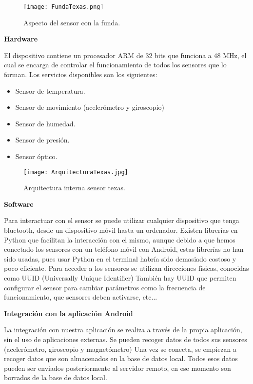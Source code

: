 \documentclass[11pt,spanish]{article}
\begin{document}
\begin{figure}[h!]
  \centering
  \texttt{[image: FundaTexas.png]}
  \caption{Aspecto del sensor con la funda.}
\end{figure}
\newpage

{\bf Hardware}
\newline

El dispositivo contiene un procesador ARM de 32 bits que funciona a 48 MHz, el cual se encarga de controlar el funcionamiento de todos los sensores que lo forman. Los servicios disponibles son los siguientes:

\begin{itemize}
  \item Sensor de temperatura.
  \item Sensor de movimiento (acelerómetro y giroscopio)
  \item Sensor de humedad.
  \item Sensor de presión.
  \item Sensor óptico.
\end{itemize}

\begin{figure}[h!]
  \centering
  \texttt{[image: ArquitecturaTexas.jpg]}
  \caption{Arquitectura interna sensor texas.}
\end{figure}
\newpage

{\bf Software}
\newline

Para interactuar con el sensor se puede utilizar cualquier dispositivo que tenga bluetooth, desde un dispositivo móvil hasta un ordenador. Existen librerías en Python que facilitan la interacción con el mismo, aunque debido a que hemos conectado los sensores con un teléfono móvil con Android, estas librerías no han sido usadas, pues usar Python en el terminal habría sido demasiado costoso y poco eficiente. Para acceder a los sensores se utilizan direcciones físicas, conocidas como UUID (Universally Unique Identifier) También hay UUID que permiten configurar el sensor para cambiar parámetros como la frecuencia de funcionamiento, que sensores deben activarse, etc...
\newline

{\bf Integración con la aplicación Android}
\newline

La integración con nuestra aplicación se realiza a través de la propia aplicación, sin el uso de aplicaciones externas. Se pueden recoger datos de todos sus sensores (acelerómetro, giroscopio y magnetómetro) Una vez se conecta, se empiezan a recoger datos que son almacenados en la base de datos local. Todos esos datos pueden ser enviados posteriormente al servidor remoto, en ese momento son borrados de la base de datos local.
\end{document}
